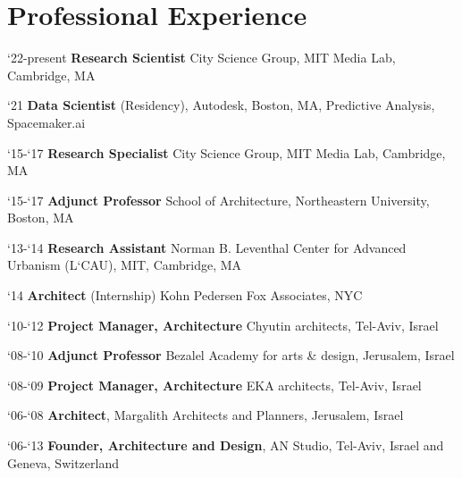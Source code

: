 \section*{Professional Experience}

\begin{tablist}
   \item[`22-present]\tab\textbf{Research Scientist}
   City Science Group, MIT Media Lab, Cambridge, MA 

   \item[`21]\tab\textbf{Data Scientist} (Residency),
   Autodesk, Boston, MA, Predictive Analysis, Spacemaker.ai

    \item[`15-`17]\tab\textbf{Research Specialist}
   City Science Group, MIT Media Lab, Cambridge, MA

   \item[`15-`17]\tab\textbf{Adjunct Professor}
   School of Architecture, Northeastern University, Boston, MA

   \item[`13-`14]\tab\textbf{Research Assistant}
   Norman B. Leventhal Center for Advanced Urbanism (L`CAU), MIT, Cambridge, MA

   \item[`14]\tab\textbf{Architect} (Internship)
   Kohn Pedersen Fox Associates, NYC

   \item[`10-`12]\tab
   \textbf{Project Manager, Architecture} Chyutin architects, Tel-Aviv, Israel

   \item[`08-`10]\tab\textbf{Adjunct Professor}
   Bezalel Academy for arts \& design, Jerusalem, Israel

   \item[`08-`09]\tab\textbf{Project Manager, Architecture}
   EKA architects, Tel-Aviv, Israel

   \item[`06-`08]\tab\textbf{Architect},
   Margalith Architects and Planners, Jerusalem, Israel

   \item[`06-`13]\tab
   \textbf{Founder, Architecture and Design},
   AN Studio, Tel-Aviv, Israel and Geneva, Switzerland
\end{tablist}
